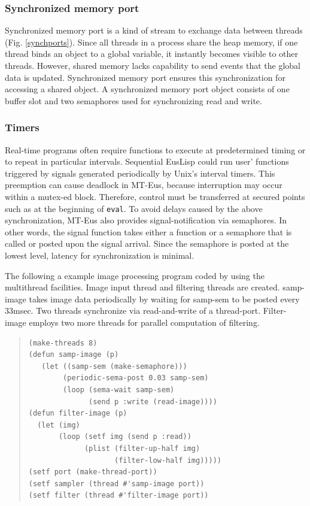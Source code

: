 \subsubsection{Synchronized memory port}
Synchronized memory port is a kind of stream to exchange data
between threads (Fig. \ref{synchports}).
Since all threads in a process share the
heap memory, if one thread binds an object to a global variable,
it  instantly becomes visible to other threads.
However, shared memory lacks capability to send events that the
global data is updated. Synchronized memory port ensures this 
synchronization for accessing a shared object. A synchronized
memory port object consists of one buffer slot and two semaphores
used for synchronizing  read and write.

\subsubsection{Timers}
Real-time programs often require functions to execute at
predetermined timing or to repeat in particular intervals.
Sequential EusLisp could run user' functions triggered by
signals generated periodically by Unix's interval timers.
This preemption can cause deadlock in MT-Eus,
because interruption may occur within a mutex-ed block.
Therefore, control must be transferred at secured points
such as at the beginning of {\tt eval}.
To avoid delays caused by the above synchronization,
MT-Eus also provides signal-notification via semaphores.
In other words, the signal function takes either a function or
a semaphore that is called or posted upon the signal arrival.
Since the semaphore is posted at the lowest level, latency
for synchronization is minimal.

The following a example image processing program
coded by using the multithread facilities.
Image input thread and filtering
threads are created. samp-image takes image data periodically
by waiting for samp-sem to be posted every 33msec.
Two threads synchronize via read-and-write of a thread-port.
Filter-image employs two more threads for parallel computation
of filtering.

\begin{quote}
\begin{verbatim}
(make-threads 8)
(defun samp-image (p)
   (let ((samp-sem (make-semaphore)))
        (periodic-sema-post 0.03 samp-sem)
        (loop (sema-wait samp-sem)
              (send p :write (read-image))))
(defun filter-image (p)
  (let (img)
       (loop (setf img (send p :read))
             (plist (filter-up-half img)
                    (filter-low-half img)))))
(setf port (make-thread-port))
(setf sampler (thread #'samp-image port))
(setf filter (thread #'filter-image port))
\end{verbatim}
\end{quote}

